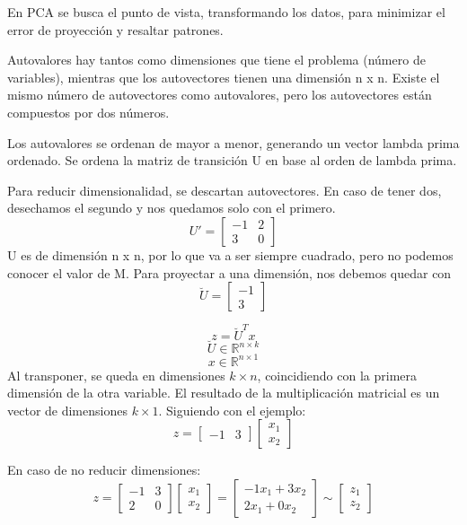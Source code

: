 En PCA se busca el punto de vista, transformando los datos, para minimizar el error de proyección y resaltar patrones. 

Autovalores hay tantos como dimensiones que tiene el problema (número de variables), mientras que los autovectores tienen una dimensión n x n. Existe el mismo número de autovectores como autovalores, pero los autovectores están compuestos por dos números. 

Los autovalores se ordenan de mayor a menor, generando un vector lambda prima ordenado. Se ordena la matriz de transición U en base al orden de lambda prima. 

Para reducir dimensionalidad, se descartan autovectores. En caso de tener dos, desechamos el segundo y nos quedamos solo con el primero. 
$$U' = \begin{bmatrix}
-1 & 2 \\ 
3 & 0
\end{bmatrix}$$
U es de dimensión n x n, por lo que va a ser siempre cuadrado, pero no podemos conocer el valor de M. Para proyectar a una dimensión, nos debemos quedar con
$$\breve{U} = \begin{bmatrix}
-1 \\ 3
\end{bmatrix}$$

$$z = \breve{U}^T x$$
$$\breve{U} \in \mathbb{R}^{n \times k}$$
$$x \in \mathbb{R}^{n \times 1}$$
Al transponer, se queda en dimensiones $k \times n$, coincidiendo con la primera dimensión de la otra variable. El resultado de la multiplicación matricial es un vector de dimensiones $k \times 1$. 
Siguiendo con el ejemplo:
$$z = \begin{bmatrix}
-1 & 3
\end{bmatrix} \begin{bmatrix}
x_1 \\ x_2
\end{bmatrix}$$

En caso de no reducir dimensiones:
$$z = \begin{bmatrix}
-1 & 3 \\ 2 & 0
\end{bmatrix} \begin{bmatrix}
x_1 \\ x_2
\end{bmatrix} = \begin{bmatrix}
-1 x_1 + 3 x_2 \\
2 x_1 + 0 x_2
\end{bmatrix} \sim \begin{bmatrix}
z_1 \\ z_2
\end{bmatrix}$$

